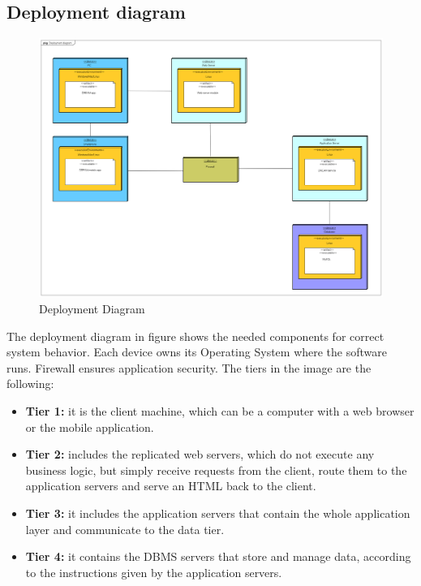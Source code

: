 \subsection{Deployment diagram}
\begin{figure}[H]
    \begin{center}
        \includegraphics[width=\textwidth]{Images/DeploymentDiagram.png}
        \caption{Deployment Diagram}
    \end{center}
\end{figure}

The deployment diagram in figure shows the needed components for correct system behavior.
Each device owns its Operating System where the software runs. Firewall ensures application security.
\newline The tiers in the image are the following:
\begin{itemize}
    \item \textbf{Tier 1:} it is the client machine, which can be a computer with a web browser or the mobile
    application.
    \item \textbf{Tier 2:} includes the replicated web servers, which do not execute any business logic, but simply receive
    requests from the client, route them to the application servers and serve an HTML back to the client.
    \item \textbf{Tier 3:} it includes the application servers that contain the whole application layer and communicate to the data tier.
    \item \textbf{Tier 4:} it contains the DBMS servers that store and manage data, according to the instructions given by the application servers.
\end{itemize}

